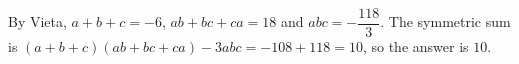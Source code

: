 By Vieta, $a+b+c=-6$, $ab+bc+ca=18$ and $abc=-\dfrac{118}{3}$. The symmetric sum is $(a+b+c)(ab+bc+ca)-3abc=-108+118=10$, so the answer is $\boxed{10}$.
